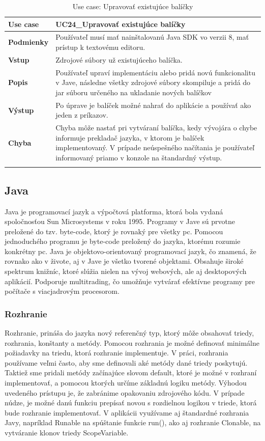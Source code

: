 {\begin{center}
\begin{longtable}{|p{2.5cm}|p{12.2cm}|}
			\hline
			\textbf{Use case} & UC24\_Upravovať existujúce balíčky \\ 
			\hline
			\textbf{Podmienky} &  Používateľ musí mať nainštalovanú Java SDK vo verzii 8, mať prístup k textovému editoru.  \\ 
			\hline
			\textbf{Vstup} & Zdrojové súbory už existujúceho balíčka.\\
			\hline
			\textbf{Popis} & Používateľ upraví implementáciu alebo pridá novú funkcionalitu v Jave, následne všetky zdrojové súbory skompiluje a pridá do \acrshort{jar} súboru určeného na ukladanie nových balíčkov\\ 
			\hline
			\textbf{Výstup} & Po úprave je balíček možné nahrať do aplikácie a používať ako jeden z príkazov.\\
			\hline
			\textbf{Chyba} & Chyba môže nastať pri vytváraní balíčka, kedy vývojára o chybe informuje prekladač jazyka, v ktorom je balíček implementovaný. V prípade neúspešného načítania je používateľ informovaný priamo v konzole na štandardný výstup.\\
			\hline
		\caption{Use case: Upravovať existujúce balíčky}
		\label{table:1}
		
	\end{longtable}
\end{center}
\subsection{Java}
\indent Java je programovací jazyk a výpočtová platforma, ktorá bola vydaná spoločnosťou Sun Microsystems v roku 1995. \cite{java} 
Programy v Jave sú prvotne preložené do tzv. byte-code, ktorý je rovnaký pre všetky \acrshort{pc}. Pomocou jednoduchého programu je byte-code preložený do jazyka, ktorému rozumie konkrétny \acrshort{pc}.
Java je objektovo-orientovaný programovací jazyk, čo znamená, že rovnako ako v živote, aj v Jave je všetko tvorené objektami. Obsahuje široké spektrum knižníc, ktoré slúžia nielen na vývoj webových, ale aj desktopových aplikácií. 
Podporuje multitrading, čo umožňuje vytvárať efektívne programy pre počítače s viacjadrovým procesorom.\cite{java}

\subsubsection{Rozhranie}
\indent Rozhranie, prináša do jazyka nový referenčný typ, ktorý môže obsahovať triedy, rozhrania, konštanty a metódy. Pomocou rozhrania je možné definovať minimálne požiadavky na triedu, ktorá rozhranie implementuje. \cite{javabook} V práci, rozhrania používame veľmi často, aby sme definovali aké metódy dané triedy poskytujú. Taktiež sme pridali metódy začínajúce slovom default, ktoré je možné v rozhraní implementovať, a pomocou ktorých určíme základnú logiku metódy. Výhodou uvedeného prístupu je, že zabránime opakovaniu zdrojového kódu. V prípade núdze, je možné danú funkciu prepísať novou s rozdielnou logikou v triede, ktorá bude rozhranie implementovať. V aplikácii využívame aj štandardné rozhrania Javy, napríklad Runable na spúštanie funkcie run(), ako aj rozhranie Clonable, na vytváranie klonov triedy ScopeVariable.

}
